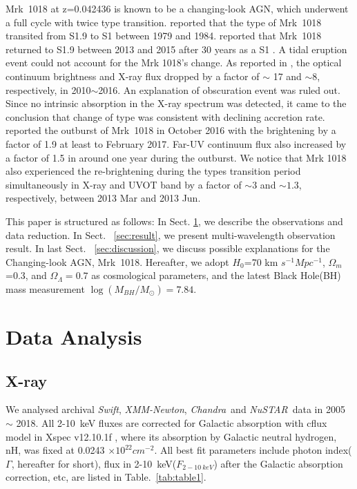 \documentclass{aastex63}
\newcommand{\xmm}{{\em XMM-Newton}}
\newcommand{\nustar}{{\em NuSTAR}}
\newcommand{\chandra}{{\em Chandra}}
\newcommand{\swift}{{\em Swift}}
\begin{document}
Mrk~1018 at z=0.042436 is known to be a changing-look AGN, which underwent a full cycle with twice type transition. \citet{1986ApJ...311..135C} reported that the type of Mrk~1018 transited from S1.9 to S1 between 1979 and 1984. \citet{2016A&A...593L...8M} reported that Mrk~1018 returned to S1.9 between 2013 and 2015 after 30 years as a S1 \citep[see also][]{2017A&A...607L...9K}. A tidal eruption event could not account for the Mrk 1018's change. As reported in \citet{2016A&A...593L...9H}, the optical continuum brightness and X-ray flux dropped by a factor of $\sim$ 17 and $\sim 8$, respectively, in 2010$\sim$2016. An explanation of obscuration event was ruled out. Since no intrinsic absorption in the X-ray spectrum was detected, it came to the conclusion that change of type was consistent with declining accretion rate. \citet{2017A&A...607L...9K} reported the outburst of Mrk~1018 in October 2016 with the brightening by a factor of 1.9 at least to February 2017. Far-UV continuum flux also increased by a factor of 1.5 in around one year during the outburst. We notice that Mrk 1018 also experienced the re-brightening during the types transition period simultaneously in X-ray and UVOT band by a factor of $\sim3$ and $\sim1.3$, respectively, between 2013 Mar and 2013 Jun.  

This paper is structured as follows: In Sect. \ref{sec:data}, we describe the observations and data reduction. In Sect. ~\ref{sec:result}, we present multi-wavelength observation result. In last Sect. ~\ref{sec:discussion}, we discuss possible explanations for the Changing-look AGN, Mrk~1018. Hereafter, we adopt $H_0$=70 km $s^{-1} Mpc^{-1}$, $\Omega_{m}$=0.3, and $\Omega_{\Lambda}=0.7 $ as cosmological parameters, and the latest Black Hole(BH) mass measurement $\log(M_{BH}/M_{\odot})=7.84$\citep{2017MNRAS.472.3492E,2018MNRAS.480.3898N}. 
\clearpage


\section{Data Analysis}\label{sec:data}
\subsection{X-ray}
We analysed archival \swift, \xmm, \chandra~and \nustar~data in 2005 $\sim$ 2018. All 2-10~keV fluxes are corrected for Galactic absorption with cflux model in Xspec v12.10.1f \citep{1996ASPC..101...17A}, where its absorption by Galactic neutral hydrogen, nH, was fixed at 0.0243 $\times 10^{22} cm^{-2}$\citep[see ][]{2016A&A...593L...9H}. All best fit parameters include photon index($\Gamma$, hereafter for short), flux in 2-10~keV($F_{2-10~keV}$) after the Galactic absorption correction, etc, are listed in Table.~\ref{tab:table1}.
\end{document}
